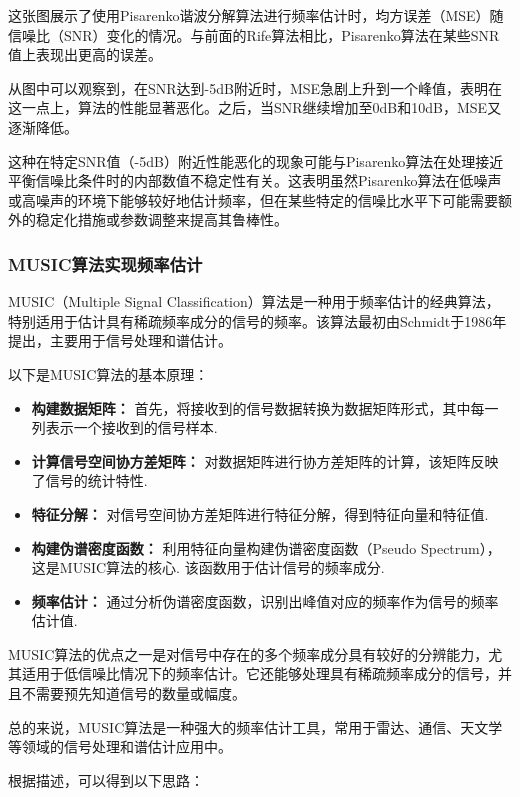 \documentclass[a4paper,12pt]{article}
\begin{document}
这张图展示了使用Pisarenko谐波分解算法进行频率估计时，均方误差（MSE）随信噪比（SNR）变化的情况。与前面的Rife算法相比，Pisarenko算法在某些SNR值上表现出更高的误差。

从图中可以观察到，在SNR达到-5dB附近时，MSE急剧上升到一个峰值，表明在这一点上，算法的性能显著恶化。之后，当SNR继续增加至0dB和10dB，MSE又逐渐降低。

这种在特定SNR值（-5dB）附近性能恶化的现象可能与Pisarenko算法在处理接近平衡信噪比条件时的内部数值不稳定性有关。这表明虽然Pisarenko算法在低噪声或高噪声的环境下能够较好地估计频率，但在某些特定的信噪比水平下可能需要额外的稳定化措施或参数调整来提高其鲁棒性。

\subsubsection{MUSIC算法实现频率估计}
MUSIC（Multiple Signal Classification）算法是一种用于频率估计的经典算法，特别适用于估计具有稀疏频率成分的信号的频率。该算法最初由Schmidt于1986年提出，主要用于信号处理和谱估计。\cite{schmidt1986multiple}

以下是MUSIC算法的基本原理：
\begin{itemize}
    \item \textbf{构建数据矩阵：} 首先，将接收到的信号数据转换为数据矩阵形式，其中每一列表示一个接收到的信号样本.
    
    \item \textbf{计算信号空间协方差矩阵：} 对数据矩阵进行协方差矩阵的计算，该矩阵反映了信号的统计特性.
    
    \item \textbf{特征分解：} 对信号空间协方差矩阵进行特征分解，得到特征向量和特征值.
    
    \item \textbf{构建伪谱密度函数：} 利用特征向量构建伪谱密度函数（Pseudo Spectrum），这是MUSIC算法的核心. 该函数用于估计信号的频率成分.
    
    \item \textbf{频率估计：} 通过分析伪谱密度函数，识别出峰值对应的频率作为信号的频率估计值.
\end{itemize}


MUSIC算法的优点之一是对信号中存在的多个频率成分具有较好的分辨能力，尤其适用于低信噪比情况下的频率估计。它还能够处理具有稀疏频率成分的信号，并且不需要预先知道信号的数量或幅度。

总的来说，MUSIC算法是一种强大的频率估计工具，常用于雷达、通信、天文学等领域的信号处理和谱估计应用中。

根据描述，可以得到以下思路：
\end{document}
